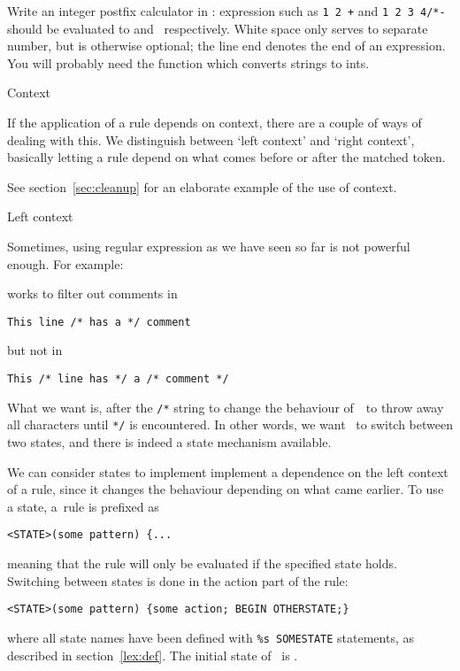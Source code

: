 \begin{594exercise}
Write an integer postfix calculator in \lex: expression such as
\verb/1 2 +/ and \verb.1 2 3 4/*-. should be evaluated to 
and~ respectively. White space only serves to separate number,
but is otherwise optional; the line end denotes the end of an
expression. You will probably need the  function  which converts strings to ints.
\end{594exercise}
\begin{answer}

\end{answer}

 {Context}
\label{sec:context}

If the application of a rule depends on context, there are a couple of
ways of dealing with this. We distinguish between `left context' and
`right context', basically letting a rule depend on what comes before or
after the matched token.

See section~\ref{sec:cleanup} for an elaborate example of the use
of context.

 {Left context}

Sometimes, using regular expression as we have seen so far is not
powerful enough. For example:

works to filter out comments in
\begin{verbatim}
This line /* has a */ comment
\end{verbatim}
but not in
\begin{verbatim}
This /* line has */ a /* comment */
\end{verbatim}
What we want is, after the \verb+/*+ string to change the behaviour
of~\lex\ to throw away all characters until \verb+*/+ is
encountered. In other words, we want \lex\ to switch between two
states, and there is indeed a state mechanism available.

We can consider states to implement implement a dependence on the left
context of a rule, since it changes the behaviour depending on what
came earlier.  To use a state, a~rule is prefixed as
\begin{verbatim}
<STATE>(some pattern) {...
\end{verbatim}
meaning that the rule will only be evaluated if the specified state holds.
Switching between states is done in the action part of the rule:
\begin{verbatim}
<STATE>(some pattern) {some action; BEGIN OTHERSTATE;}
\end{verbatim}
where all state names have been defined with \verb+%s SOMESTATE+
statements, as described in section~\ref{lex:def}. The initial state
of \lex\ is .

